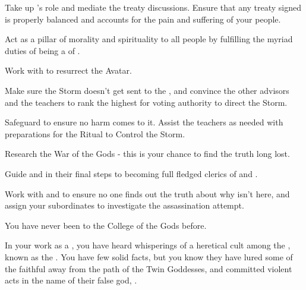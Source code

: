 \documentclass[char]{GL2020}
\begin{document}
\begin{itemz}
	\item Take up \cHeadDiplomat{}'s role and mediate the treaty discussions. Ensure that any treaty signed is properly balanced and accounts for the pain and suffering of your people.
	\item Act as a pillar of morality and spirituality to all people by fulfilling the myriad duties of being a \cEbbPriest{\cleric} of \cEbbFull{\full}.
	\item Work with \cFlowPriest{} to resurrect the \cEbb{} Avatar.
	\item Make sure the Storm doesn't get sent to the \pShip{}, and convince the other \pShip{} advisors and the \pFarm{} teachers to rank \cWarlordDaughter{} the highest for voting authority to direct the Storm.
	\item Safeguard \iChalice{} to ensure no harm comes to it. Assist the teachers as needed with preparations for the Ritual to Control the Storm.
	\item Research the War of the Gods - this is your chance to find the truth long lost.
	\item Guide \cInitiate{} and \cWarlordDaughter{} in their final steps to becoming full fledged clerics of \cEbb{} and \cFlow{}.
	\item Work with \cJuniorStatesman{} and \cChupLeader{} to ensure no one finds out the truth about why \cHeadDiplomat{} isn't here, and assign your subordinates to investigate the assassination attempt.
\end{itemz}

\begin{itemz}[Notes]
	\item You have never been to the College of the Gods before.
	\item In your work as a \cEbbPriest{\cleric}, you have heard whisperings of a heretical cult among the \pShip{}, known as the \pGoaties{}. You have few solid facts, but you know they have lured some of the faithful away from the path of the Twin Goddesses, and committed violent acts in the name of their false god, \cGenesis{}.
\end{itemz}
\end{document}
